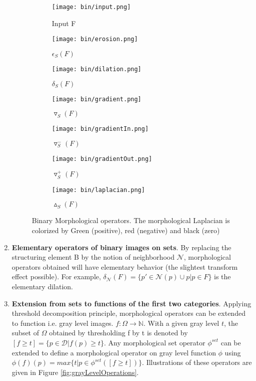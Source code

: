 \begin{enumerate}
\begin{figure}
	\begin{subfigure}{0.2\textwidth}
	 	\texttt{[image: bin/input.png]} \caption{Input F}\label{fig:inputbin} \end{subfigure}
	\begin{subfigure}{0.2\textwidth}
	 	\texttt{[image: bin/erosion.png]} \caption{$ \epsilon_S (F)$}\label{fig:erosionbin} \end{subfigure}
	\begin{subfigure}{0.2\textwidth}
		\texttt{[image: bin/dilation.png]} \caption{$ \delta_S (F)$}\label{fig:dilationbin} \end{subfigure}
	\centering
		
	\begin{subfigure}{0.2\textwidth}
		\texttt{[image: bin/gradient.png]} 
		\caption{$ \triangledown_S (F)$}\label{fig:gradientbin} \end{subfigure}
	\begin{subfigure}{0.2\textwidth}
		\texttt{[image: bin/gradientIn.png]} 
		\caption{$ \triangledown_S ^- (F)$}\label{fig:gradientInbin} \end{subfigure}		
	\begin{subfigure}{0.2\textwidth}	
		\texttt{[image: bin/gradientOut.png]} 
		\caption{$ \triangledown_S ^+ (F)$}\label{fig:gradientOutbin} \end{subfigure}
	\begin{subfigure}{0.2\textwidth}	
		\texttt{[image: bin/laplacian.png]} 
		\caption{$\vartriangle_S (F)$}\label{fig:laplacianbin} \end{subfigure}					
	\centering
	\caption[Example of \textit{morphological operators} on binary image] {Binary Morphological operators. The morphological Laplacian is colorized by Green (positive), red (negative) and black (zero) }
	\label{fig:binOperations}
\end{figure}


\item \textbf{Elementary operators of binary images on sets}. By replacing the structuring element B by the notion of neighborhood $\mathcal{N}$, morphological operators obtained will have elementary behavior (the slightest transform effect possible). For example, $ \delta_\mathcal{N} (F) = \lbrace p' \in \mathcal{N}(p) \cup p  \vert  p \in F \rbrace $ is the elementary dilation.

\item \textbf{Extension from sets to functions of the first two categories}. Applying threshold decomposition principle, morphological operators can be extended to function i.e. gray level images. $ f: \Omega \rightarrow \mathbb{N}$. With a given gray level $t$, the subset of $ \Omega $ obtained by thresholding f by t is denoted by $[f \geq t] = \lbrace p \in \mathcal{D} \vert f(p) \geq t \rbrace $. Any morphological set operator $\phi^{set}$ can be extended to define a morphological operator on gray level function $\phi$ using $ \phi(f)(p) = max \lbrace t \vert p \in \phi^{set}([f \geq t]) \rbrace $. Illustrations of these operators are given in Figure \ref{fig:grayLevelOperations}.


\end{enumerate}
